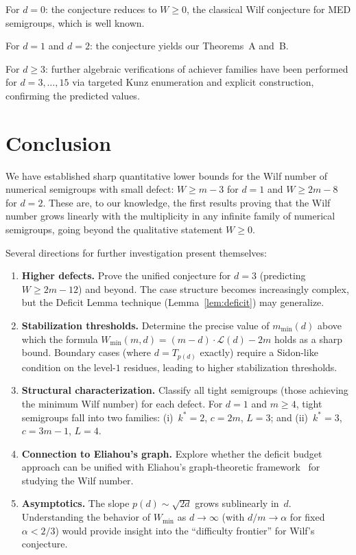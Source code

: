 \documentclass[11pt]{amsart}
\theoremstyle{definition}
\theoremstyle{remark}
\begin{document}
For $d = 0$: the conjecture reduces to $W \ge 0$, the classical Wilf conjecture
for MED semigroups, which is well known.

For $d = 1$ and $d = 2$: the conjecture yields our Theorems~A and~B.

For $d \ge 3$: further algebraic verifications of achiever families have been
performed for $d = 3, \ldots, 15$ via targeted Kunz enumeration and
explicit construction, confirming the predicted values.

\section{Conclusion}\label{sec:conclusion}

We have established sharp quantitative lower bounds for the Wilf number
of numerical semigroups with small defect:
$W \ge m - 3$ for $d = 1$ and $W \ge 2m - 8$ for $d = 2$.
These are, to our knowledge, the first results proving that the Wilf number
grows linearly with the multiplicity in any infinite family of numerical
semigroups, going beyond the qualitative statement $W \ge 0$.

Several directions for further investigation present themselves:

\begin{enumerate}[nosep]
  \item \textbf{Higher defects.}
    Prove the unified conjecture for $d = 3$ (predicting $W \ge 2m - 12$)
    and beyond.  The case structure becomes increasingly complex, but the
    Deficit Lemma technique (Lemma~\ref{lem:deficit}) may generalize.

  \item \textbf{Stabilization thresholds.}
    Determine the precise value of $m_{\min}(d)$ above which the formula
    $W_{\min}(m, d) = (m - d) \cdot \mathcal{L}(d) - 2m$ holds as a sharp bound.
    Boundary cases (where $d = T_{p(d)}$ exactly) require a Sidon-like condition
    on the level-$1$ residues, leading to higher stabilization thresholds.

  \item \textbf{Structural characterization.}
    Classify all tight semigroups (those achieving the minimum Wilf number)
    for each defect.  For $d = 1$ and $m \ge 4$, tight semigroups fall into
    two families: (i)~$k^* = 2$, $c = 2m$, $L = 3$; and
    (ii)~$k^* = 3$, $c = 3m - 1$, $L = 4$.

  \item \textbf{Connection to Eliahou's graph.}
    Explore whether the deficit budget approach can be unified with
    Eliahou's graph-theoretic framework~\cite{Eliahou2020} for studying
    the Wilf number.

  \item \textbf{Asymptotics.}
    The slope $p(d) \sim \sqrt{2d}$ grows sublinearly in~$d$.
    Understanding the behavior of $W_{\min}$ as $d \to \infty$ (with
    $d/m \to \alpha$ for fixed $\alpha < 2/3$) would provide insight
    into the ``difficulty frontier'' for Wilf's conjecture.
\end{enumerate}
\end{document}
